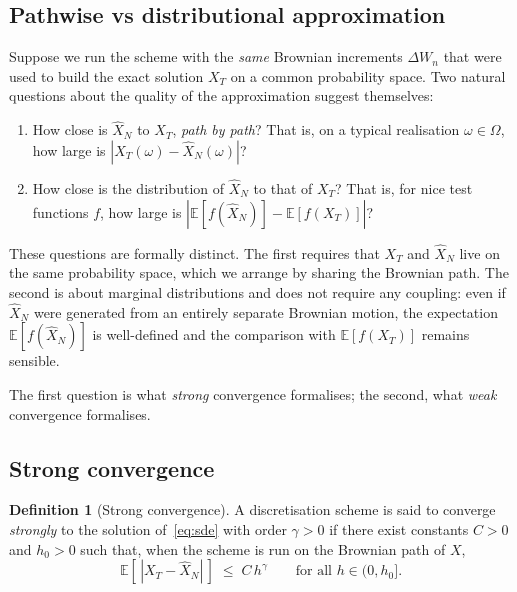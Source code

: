 \documentclass[11pt,a4paper]{article}
\theoremstyle{plain}
\theoremstyle{definition}
\newtheorem{definition}[theorem]{Definition}
\theoremstyle{remark}
\newcommand{\E}{\mathbb{E}}
\begin{document}
\subsection{Pathwise vs distributional approximation}

Suppose we run the scheme with the \emph{same} Brownian increments
$\Delta W_n$ that were used to build the exact solution $X_T$ on a
common probability space. Two natural questions about the quality of
the approximation suggest themselves:

\begin{enumerate}
\item How close is $\hat X_N$ to $X_T$, \emph{path by path}? That is,
on a typical realisation $\omega \in \Omega$, how large is
$|X_T(\omega) - \hat X_N(\omega)|$?
\item How close is the distribution of $\hat X_N$ to that of $X_T$?
That is, for nice test functions $f$, how large is
$|\E[f(\hat X_N)] - \E[f(X_T)]|$?
\end{enumerate}

These questions are formally distinct. The first requires that
$X_T$ and $\hat X_N$ live on the same probability space, which we
arrange by sharing the Brownian path. The second is about marginal
distributions and does not require any coupling: even if $\hat X_N$
were generated from an entirely separate Brownian motion, the
expectation $\E[f(\hat X_N)]$ is well-defined and the comparison with
$\E[f(X_T)]$ remains sensible.

The first question is what \emph{strong} convergence formalises; the
second, what \emph{weak} convergence formalises.

\subsection{Strong convergence}

\begin{definition}[Strong convergence]
\label{def:strong}
A discretisation scheme is said to converge \emph{strongly} to the
solution of~\eqref{eq:sde} with order $\gamma > 0$ if there exist
constants $C > 0$ and $h_0 > 0$ such that, when the scheme is run on
the Brownian path of $X$,
\begin{equation}
\label{eq:strong-defn}
\E\!\left[\, |X_T - \hat X_N| \,\right] \;\leq\; C\, h^\gamma
\qquad \text{for all } h \in (0, h_0].
\end{equation}
\end{definition}
\end{document}
